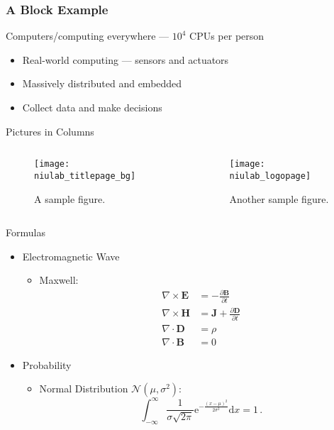 \documentclass[usepdftitle=false]{beamer}
\begin{document}
\begin{frame}
  \frametitle{A Block Example}
  \begin{block}{Computers/computing everywhere --- $10^4$ CPUs per person}
    \begin{itemize}
      \item Real-world computing --- sensors and actuators
      \item Massively distributed and embedded
      \item Collect data and make decisions
    \end{itemize}
  \end{block}
\end{frame}

\begin{frame}{Pictures in Columns}
  \begin{columns}
    \begin{column}{.5\textwidth}
      \begin{figure}[htbp]
        \centering
        \texttt{[image: niulab\_titlepage\_bg]}
        \caption{A sample figure.}
      \end{figure}
    \end{column}
    \begin{column}{.5\textwidth}
      \begin{figure}[htbp]
        \centering
        \texttt{[image: niulab\_logopage]}
        \caption{Another sample figure.}
      \end{figure}
    \end{column}
  \end{columns}
\end{frame}

\begin{frame}{Formulas}
  \begin{itemize}
    \item Electromagnetic Wave
      \begin{itemize}
        \item Maxwell:
          \begin{align}
            \nabla \times \mathbf{E} & = - \frac{\partial
            \mathbf{B}}{\partial t}\\
            \nabla \times \mathbf{H} & = \mathbf{J} +
            \frac{\partial \mathbf{D}}{\partial t}\\
            \nabla \cdot \mathbf{D} & = \rho \\
            \nabla \cdot\mathbf{B} & = 0
            \label{eqn:maxwell}
          \end{align}
      \end{itemize}
    \item Probability
      \begin{itemize}
        \item Normal Distribution $\mathcal{N}(\mu,\sigma^2)$:
          \[
          \int_{-\infty}^{\infty}\frac{1}{\sigma\sqrt{2\pi}}\mathrm{e}^{-\frac{(x-\mu)^2}{2\sigma^2}}\mathrm{d}x= 1 \, .
          \]
      \end{itemize}
  \end{itemize}
\end{frame}
\end{document}
